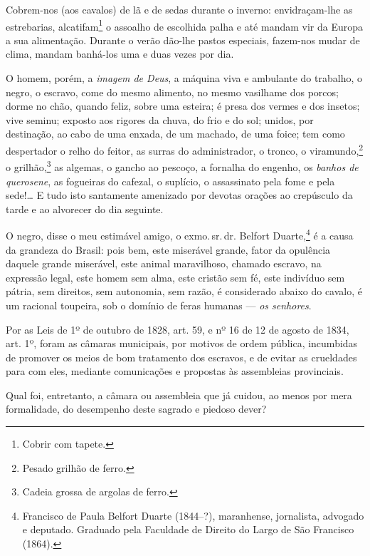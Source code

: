 Cobrem-nos (aos cavalos) de lã e de sedas durante o inverno: %
envidraçam-lhe as estrebarias, alcatifam\footnote{Cobrir com tapete.}
o assoalho de escolhida palha e até mandam vir da Europa a sua
alimentação. Durante o verão dão-lhe pastos especiais, fazem-nos mudar
de clima, mandam banhá-los uma e duas vezes por dia.

O homem, porém, a \emph{imagem de Deus}, a máquina viva e ambulante do
trabalho, o negro, o escravo, come do mesmo alimento, no mesmo vasilhame
dos porcos; dorme no chão, quando feliz, sobre uma esteira; é presa dos
vermes e dos insetos; vive seminu; exposto aos rigores da chuva, do
frio e do sol; unidos, por destinação, ao cabo de uma enxada, de um
machado, de uma foice; tem como despertador o relho do feitor, as surras
do administrador, o tronco, o viramundo,\footnote{Pesado grilhão de
  ferro.} o grilhão,\footnote{Cadeia grossa de argolas de ferro.} as
algemas, o gancho ao pescoço, a fornalha do engenho, os \emph{banhos de
querosene}, as fogueiras do cafezal, o suplício, o assassinato pela fome
e pela sede!\ldots{} E tudo isto santamente amenizado por devotas orações ao
crepúsculo da tarde e ao alvorecer do dia seguinte.

O negro, disse o meu estimável amigo, o exmo.\,sr.\,dr. Belfort
Duarte,\footnote{Francisco de Paula Belfort Duarte (1844--?),
  maranhense, jornalista, advogado e deputado. Graduado pela Faculdade
  de Direito do Largo de São Francisco (1864).} é a causa da grandeza do
Brasil: pois bem, este miserável grande, fator da opulência daquele
grande miserável, este animal maravilhoso, chamado escravo, na expressão
legal, este homem sem alma, este cristão sem fé, este indivíduo sem
pátria, sem direitos, sem autonomia, sem razão, é considerado abaixo do
cavalo, é um racional toupeira, sob o domínio de feras humanas ---
\emph{os senhores}.

Por as Leis de 1º de outubro de 1828, art. 59, e nº 16 de 12 de agosto
de 1834, art. 1º, foram as câmaras municipais, por motivos de ordem
pública, incumbidas de promover os meios de bom tratamento dos escravos,
e de evitar as crueldades para com eles, mediante comunicações e
propostas às assembleias provinciais.

Qual foi, entretanto, a câmara ou assembleia que já cuidou, ao menos por
mera formalidade, do desempenho deste sagrado e piedoso dever?


